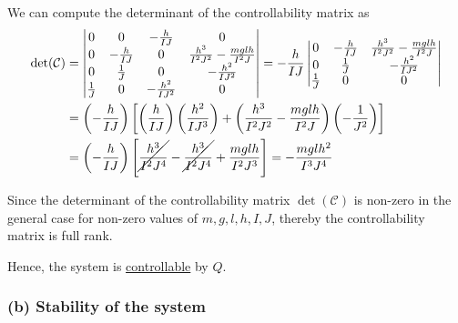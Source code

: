 We can compute the determinant of the controllability matrix as
\begin{align*}
    \text{det}(\mathcal{C})
     & =
    \begin{vmatrix}
        0           & 0             & -\frac{h}{IJ}     & 0                                         \\
        0           & -\frac{h}{IJ} & 0                 & \frac{h^3}{I^2 J^2}-\frac{m g l h}{I^2 J} \\
        0           & \frac{1}{J}   & 0                 & -\frac{h^2}{IJ^2}                         \\
        \frac{1}{J} & 0             & -\frac{h^2}{IJ^2} & 0
    \end{vmatrix}
    =
    -\frac{h}{IJ}
    \begin{vmatrix}
        0           & -\frac{h}{IJ} & \frac{h^3}{I^2 J^2}-\frac{m g l h}{I^2 J} \\
        0           & \frac{1}{J}   & -\frac{h^2}{IJ^2}                         \\
        \frac{1}{J} & 0             & 0
    \end{vmatrix}
    \\ & =
    \left( -\frac{h}{IJ} \right) \left[ \left( \frac{h}{IJ} \right) \left( \frac{h^2}{I J^3} \right) + \left( \frac{h^3}{I^2 J^2}-\frac{m g l h}{I^2 J} \right) \left( -\frac{1}{J^2} \right) \right]
    \\ & =
    \left( -\frac{h}{IJ} \right) \left[ \cancel{\frac{h^3}{I^2 J^4}} - \cancel{\frac{h^3}{I^2 J^4}} + \frac{m g l h}{I^2 J^3} \right]
    =
    -\frac{m g l h^2}{I^3 J^4}
\end{align*}

Since the determinant of the controllability matrix \( \det(\mathcal{C}) \) is non-zero in the general case for non-zero values of \( m, g, l, h, I, J \), thereby the controllability matrix is full rank.

Hence, the system is \underline{controllable} by \( Q \).

\clearpage
\subsubsection*{(b) Stability of the system}

